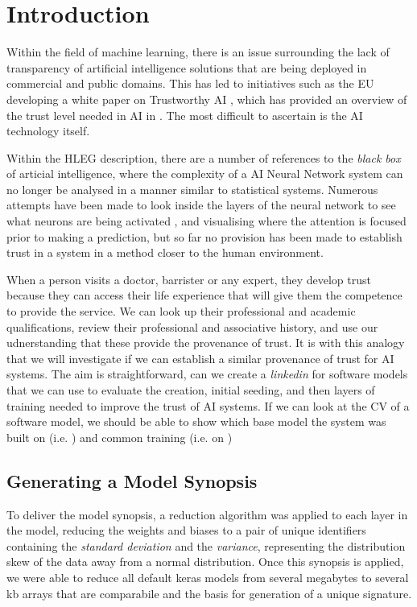 \section{Introduction}
Within the field of machine learning, there is an issue surrounding the lack of transparency of artificial intelligence solutions that are being deployed in commercial and public domains. This has led to initiatives such as the EU developing a white paper on Trustworthy AI \cite{high-level_expert_group_on_ai_ethics_2019}, which has provided an overview of the trust level needed in AI in \cite{ryan_ai_2020}. The most difficult to ascertain is the AI technology itself.

Within the HLEG description, there are a number of references to the \textit{black box} of articial intelligence, where the complexity of a AI Neural Network system can no longer be analysed in a manner similar to statistical systems. Numerous attempts have been made to look inside the layers of the neural network to see what neurons are being activated \cite{kim_interpretability_2018}, and visualising where the attention is focused prior to making a prediction, but so far no provision has been made to establish trust in a system in a method closer to the human environment.

When a person visits a doctor, barrister or any expert, they develop trust because they can access their life experience that will give them the competence to provide the service. We can look up their professional and academic qualifications, review their professional and associative history, and use our udnerstanding that these provide the provenance of trust. It is with this analogy that we will investigate if we can establish a similar provenance of trust for AI systems. The aim is straightforward, can we create a \textit{linkedin} for software models that we can use to evaluate the creation, initial seeding, and then layers of training needed to improve the trust of AI systems. If we can look at the CV of a software model, we should be able to show which base model the system was built on (i.e.  ) and common training (i.e. on \cite{deng_imagenet_2009})

\subsection{Generating a Model Synopsis}
To deliver the model synopsis, a reduction algorithm was applied to each layer in the model, reducing the weights and biases to a pair of unique identifiers containing the \textit{standard deviation} and the \textit{variance}, representing the distribution skew of the data away from a normal distribution. Once this synopsis is applied, we were able to reduce all default keras models from several megabytes to several kb arrays that are comparabile and the basis for generation of a unique signature.

